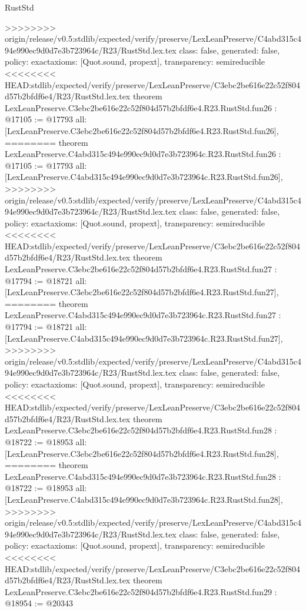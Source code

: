\begin{lexlean}{RustStd}
\begin{coremodule}
{\begin{coremodule}
{{{{{{{{{{{{{{{{{{{{{{{{{{{{{>>>>>>>> origin/release/v0.5:stdlib/expected/verify/preserve/LexLeanPreserve/C4abd315c494e990ec9d0d7e3b723964c/R23/RustStd.lex.tex
  class: false,
  generated: false,
  policy: exact{axioms: [Quot.sound, propext]},
  transparency: semireducible
}
<<<<<<<< HEAD:stdlib/expected/verify/preserve/LexLeanPreserve/C3ebc2be616e22c52f804d57b2bfdf6e4/R23/RustStd.lex.tex
theorem LexLeanPreserve.C3ebc2be616e22c52f804d57b2bfdf6e4.R23.RustStd.fun26 : @17105 := @17793 {
  all: [LexLeanPreserve.C3ebc2be616e22c52f804d57b2bfdf6e4.R23.RustStd.fun26],
========
theorem LexLeanPreserve.C4abd315c494e990ec9d0d7e3b723964c.R23.RustStd.fun26 : @17105 := @17793 {
  all: [LexLeanPreserve.C4abd315c494e990ec9d0d7e3b723964c.R23.RustStd.fun26],
>>>>>>>> origin/release/v0.5:stdlib/expected/verify/preserve/LexLeanPreserve/C4abd315c494e990ec9d0d7e3b723964c/R23/RustStd.lex.tex
  class: false,
  generated: false,
  policy: exact{axioms: [Quot.sound, propext]},
  transparency: semireducible
}
<<<<<<<< HEAD:stdlib/expected/verify/preserve/LexLeanPreserve/C3ebc2be616e22c52f804d57b2bfdf6e4/R23/RustStd.lex.tex
theorem LexLeanPreserve.C3ebc2be616e22c52f804d57b2bfdf6e4.R23.RustStd.fun27 : @17794 := @18721 {
  all: [LexLeanPreserve.C3ebc2be616e22c52f804d57b2bfdf6e4.R23.RustStd.fun27],
========
theorem LexLeanPreserve.C4abd315c494e990ec9d0d7e3b723964c.R23.RustStd.fun27 : @17794 := @18721 {
  all: [LexLeanPreserve.C4abd315c494e990ec9d0d7e3b723964c.R23.RustStd.fun27],
>>>>>>>> origin/release/v0.5:stdlib/expected/verify/preserve/LexLeanPreserve/C4abd315c494e990ec9d0d7e3b723964c/R23/RustStd.lex.tex
  class: false,
  generated: false,
  policy: exact{axioms: [Quot.sound, propext]},
  transparency: semireducible
}
<<<<<<<< HEAD:stdlib/expected/verify/preserve/LexLeanPreserve/C3ebc2be616e22c52f804d57b2bfdf6e4/R23/RustStd.lex.tex
theorem LexLeanPreserve.C3ebc2be616e22c52f804d57b2bfdf6e4.R23.RustStd.fun28 : @18722 := @18953 {
  all: [LexLeanPreserve.C3ebc2be616e22c52f804d57b2bfdf6e4.R23.RustStd.fun28],
========
theorem LexLeanPreserve.C4abd315c494e990ec9d0d7e3b723964c.R23.RustStd.fun28 : @18722 := @18953 {
  all: [LexLeanPreserve.C4abd315c494e990ec9d0d7e3b723964c.R23.RustStd.fun28],
>>>>>>>> origin/release/v0.5:stdlib/expected/verify/preserve/LexLeanPreserve/C4abd315c494e990ec9d0d7e3b723964c/R23/RustStd.lex.tex
  class: false,
  generated: false,
  policy: exact{axioms: [Quot.sound, propext]},
  transparency: semireducible
}
<<<<<<<< HEAD:stdlib/expected/verify/preserve/LexLeanPreserve/C3ebc2be616e22c52f804d57b2bfdf6e4/R23/RustStd.lex.tex
theorem LexLeanPreserve.C3ebc2be616e22c52f804d57b2bfdf6e4.R23.RustStd.fun29 : @18954 := @20343 {
}}}}}}}}}}}}}}}}}}}}}}}}}}}}}}}}
\end{coremodule}}
\end{coremodule}
\end{lexlean}
